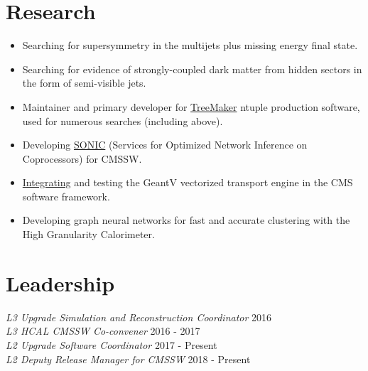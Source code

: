 \section{Research}
\begin{itemize}[leftmargin=12pt]
\item Searching for supersymmetry in the multijets plus missing energy final state.
\item Searching for evidence of strongly-coupled dark matter from hidden sectors in the form of semi-visible jets.
\item Maintainer and primary developer for \href{https://github.com/TreeMaker/TreeMaker}{TreeMaker} ntuple production software, used for numerous searches (including above).
\item Developing \href{https://github.com/hls-fpga-machine-learning/SonicCMS/}{SONIC} (Services for Optimized Network Inference on Coprocessors) for CMSSW.
\item \href{https://github.com/kpedro88/SimGVCore}{Integrating} and testing the GeantV vectorized transport engine in the CMS software framework.
\item Developing graph neural networks for fast and accurate clustering with the High Granularity Calorimeter.
\end{itemize}

\section{Leadership}
{\sl L3 Upgrade Simulation and Reconstruction Coordinator} \hfill 2016\\
{\sl L3 HCAL CMSSW Co-convener} \hfill 2016 - 2017\\
{\sl L2 Upgrade Software Coordinator} \hfill 2017 - Present\\
{\sl L2 Deputy Release Manager for CMSSW} \hfill 2018 - Present%

